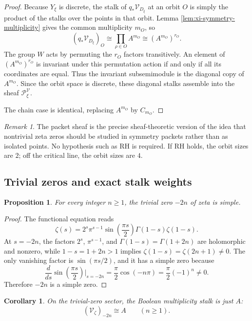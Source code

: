 \documentclass[11pt,a4paper]{article}
\newtheorem{proposition}[theorem]{Proposition}
\newtheorem{corollary}[theorem]{Corollary}
\theoremstyle{definition}
\theoremstyle{remark}
\newtheorem{remark}[theorem]{Remark}
\newcommand{\cV}{\mathcal V}
\begin{document}
\begin{proof}
Because $Y_\xi$ is discrete, the stalk of $q_*\cV_{D_\xi}$ at an orbit $O$ is simply the product of the stalks over the points in that orbit.  Lemma \ref{lem:xi-symmetry-multiplicity} gives the common multiplicity $m_O$, so
\[
(q_*\cV_{D_\xi})_O\cong \prod_{\rho\in O} A^{m_O}\cong (A^{m_O})^{r_O}.
\]
The group $W$ acts by permuting the $r_O$ factors transitively.  An element of $(A^{m_O})^{r_O}$ is invariant under this permutation action if and only if all its coordinates are equal.  Thus the invariant subsemimodule is the diagonal copy of $A^{m_O}$.  Since the orbit space is discrete, these diagonal stalks assemble into the sheaf $\mathcal P_\xi^{\cV}$.

The chain case is identical, replacing $A^{m_O}$ by $C_{m_O}$.
\end{proof}

\begin{remark}
The packet sheaf is the precise sheaf-theoretic version of the idea that nontrivial zeta zeros should be studied in symmetry packets rather than as isolated points.  No hypothesis such as RH is required.  If RH holds, the orbit sizes are $2$; off the critical line, the orbit sizes are $4$.
\end{remark}

\subsection{Trivial zeros and exact stalk weights}

\begin{proposition}\label{prop:trivial-simple}
For every integer $n\ge1$, the trivial zero $-2n$ of zeta is simple.
\end{proposition}

\begin{proof}
The functional equation reads
\[
\zeta(s)=2^s\pi^{s-1}\sin\!\left(\frac{\pi s}{2}\right)\Gamma(1-s)\zeta(1-s).
\]
At $s=-2n$, the factors $2^s$, $\pi^{s-1}$, and $\Gamma(1-s)=\Gamma(1+2n)$ are holomorphic and nonzero, while $1-s=1+2n>1$ implies $\zeta(1-s)=\zeta(2n+1)\neq0$.  The only vanishing factor is $\sin(\pi s/2)$, and it has a simple zero because
\[
\frac{d}{ds}\sin\!\left(\frac{\pi s}{2}\right)\Big|_{s=-2n}=
\frac\pi2\cos(-n\pi)=\frac\pi2(-1)^n\neq0.
\]
Therefore $-2n$ is a simple zero.
\end{proof}

\begin{corollary}\label{cor:trivial-stalk}
On the trivial-zero sector, the Boolean multiplicity stalk is just $A$:
\[
(\cV_\zeta)_{-2n}\cong A\qquad(n\ge1).
\]
\end{corollary}
\end{document}
